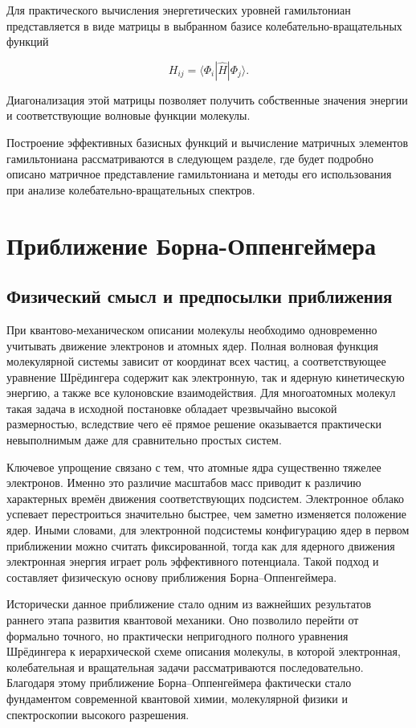 Для практического вычисления энергетических уровней
гамильтониан представляется в виде матрицы
в выбранном базисе колебательно-вращательных функций

\begin{equation}
H_{ij} =
\langle \Phi_i | \hat{H} | \Phi_j \rangle .
\end{equation}

Диагонализация этой матрицы позволяет получить
собственные значения энергии и соответствующие
волновые функции молекулы.

Построение эффективных базисных функций
и вычисление матричных элементов гамильтониана
рассматриваются в следующем разделе,
где будет подробно описано
матричное представление гамильтониана
и методы его использования
при анализе колебательно-вращательных спектров.

\section{Приближение Борна-Оппенгеймера}

\subsection{Физический смысл и предпосылки приближения}

При квантово-механическом описании молекулы необходимо одновременно
учитывать движение электронов и атомных ядер. Полная волновая функция
молекулярной системы зависит от координат всех частиц, а соответствующее
уравнение Шрёдингера содержит как электронную, так и ядерную кинетическую
энергию, а также все кулоновские взаимодействия. Для многоатомных
молекул такая задача в исходной постановке обладает чрезвычайно высокой
размерностью, вследствие чего её прямое решение оказывается практически
невыполнимым даже для сравнительно простых систем.

Ключевое упрощение связано с тем, что атомные ядра существенно тяжелее
электронов. Именно это различие масштабов масс приводит к различию
характерных времён движения соответствующих подсистем. Электронное
облако успевает перестроиться значительно быстрее, чем заметно изменяется
положение ядер. Иными словами, для электронной подсистемы конфигурацию
ядер в первом приближении можно считать фиксированной, тогда как для
ядерного движения электронная энергия играет роль эффективного потенциала.
Такой подход и составляет физическую основу приближения
Борна--Оппенгеймера.

Исторически данное приближение стало одним из важнейших результатов
раннего этапа развития квантовой механики. Оно позволило перейти
от формально точного, но практически непригодного полного уравнения
Шрёдингера к иерархической схеме описания молекулы, в которой
электронная, колебательная и вращательная задачи рассматриваются
последовательно. Благодаря этому приближение Борна--Оппенгеймера
фактически стало фундаментом современной квантовой химии,
молекулярной физики и спектроскопии высокого разрешения.

